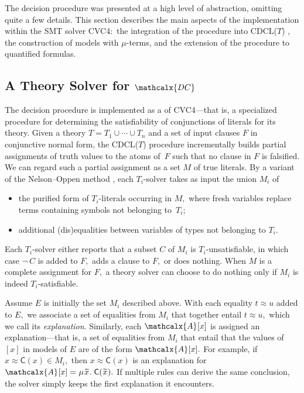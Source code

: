 \documentclass[smallcondensed,draft]{svjour3}
\newcommand\MU{\vvthinspace\mu\vvthinspace}
\newcommand\const[1]{\textsf{#1}}
\newcommand{\Ec}{E}
\newcommand{\teq}{\approx}
\newcommand{\ec}[1]{[#1]}
\newcommand{\Val}{\mathcalx{A}\vvthinspace}
\newcommand{\Varec}[1]{\vvthinspace\widetilde{#1}\vvthinspace}
\newcommand{\thD}{\mathcalx{DC}}
\newcommand\vvthinspace{\kern+0.041667em}
\begin{document}
The decision procedure was presented at a high level of abstraction, omitting
quite a few details. This section describes the main aspects of the
implementation within the SMT solver CVC4:\ the integration of the
procedure into CDCL($T$)
\cite{ganzinger-et-al-2004}, the construction of models with $\mu$-terms,
and the extension of the procedure to quantified formulas.

\subsection{A Theory Solver for $\thD$}

The decision procedure is implemented as a  of CVC4---that is, a
specialized procedure for determining the satisfiability of conjunctions of
literals for its theory.
Given a theory $T = T_1 \mathrel\cup \cdots \mathrel\cup T_n$ and a set of
input clauses $F$ in conjunctive normal form, the CDCL($T$) procedure
incrementally builds partial assignments of
truth values to the atoms of~$F$ such that no clause in $F$ is falsified. We can regard such a
partial assignment as a set $M$ of true literals.
By a variant \cite{jovanovic2011sharing}
of the Nelson--Oppen method \cite{nelson-oppen-1979},
each $T_i$-solver %
takes as input the union $M_i$
of
\begin{itemize}
\item the purified form of $T_i$-literals occurring in $M,$ where fresh
variables replace terms containing symbols not belonging to~$T_i$;
\item additional (dis)equalities between variables of types not belonging to
$T_i.$
\end{itemize}
Each $T_i$-solver
either reports that a subset $C$ of $M_i$ is $T_i$-unsatisfiable, in which case
$\neg\: C$ is added to $F\!,$ adds a clause to $F\!,$ or does nothing.
When $M$ is a complete assignment for $F\!,$ a theory solver can choose to do
nothing only if $M_i$ is indeed $T_i$-satisfiable.

Assume $\Ec$ is initially the set $M_i$ described above. With each equality $t \teq u$ added
to $\Ec,$ we associate a set of equalities from $M_i$ that together entail $t
\teq u,$ which we call its \emph{explanation}.
Similarly, each $\Val \ec{x}$ is assigned an explanation---that is, a set
of equalities from $M_i$ that entail that the values of $\ec{x}$ in models of
$\Ec$ are of the form $\Val \ec{x}.$ For example, if $x \teq \const{C}( x ) \in
M_i,$ then $x \teq \const{C}( x )$ is an %
explanation for $\Val \ec{x} = \MU {\Varec{x}}.\; \const{C}( {\Varec{x}} ).$
If multiple rules can derive the same conclusion,
the solver simply keeps the first explanation it encounters.
\end{document}
